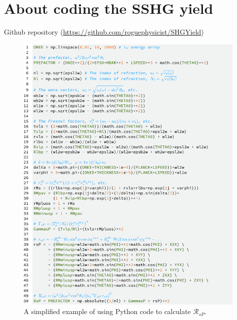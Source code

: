 
\section{About coding the SSHG yield}

Github repository (\url{https://github.com/roguephysicist/SHGYield})

\begin{figure}
\centering 
\includegraphics[scale=0.9]{content/figures/code-shgyield}
\caption{A simplified example of using Python code to calculate
$\mathcal{R}_{sP}$.}
\label{fig:code-shgyield}
\end{figure}

\stopcontents[chapters]

